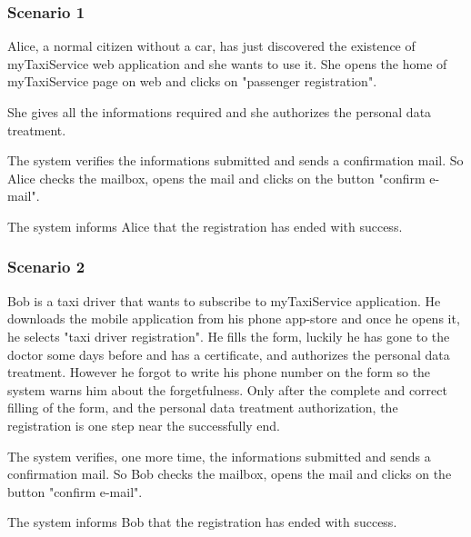 \subsubsection{Scenario 1}
Alice, a normal citizen without a car, has just discovered the existence of myTaxiService web application and she wants to use it. 
She opens the home of myTaxiService page on web and clicks on "passenger registration". 

She gives all the informations required and she authorizes the personal data treatment. 

The system verifies the informations submitted and sends a confirmation mail.
So Alice checks the mailbox, opens the mail and clicks on the button "confirm e-mail". 

The system informs Alice that the registration has ended with success.

\subsubsection{Scenario 2}
Bob is a taxi driver that wants to subscribe to myTaxiService application. 
He downloads the mobile application from his phone app-store and once he opens it, he selects "taxi driver registration". 
He fills the form, luckily he has gone to the doctor some days before and has a certificate, and authorizes the personal data treatment.
However he forgot to write his phone number on the form so the system warns him about the forgetfulness.
Only after the complete and correct filling of the form, and the personal data treatment authorization, the registration is one step near the successfully end.

The system verifies, one more time, the informations submitted and sends a confirmation mail.
So Bob checks the mailbox, opens the mail and clicks on the button "confirm e-mail". 

The system informs Bob that the registration has ended with success.




